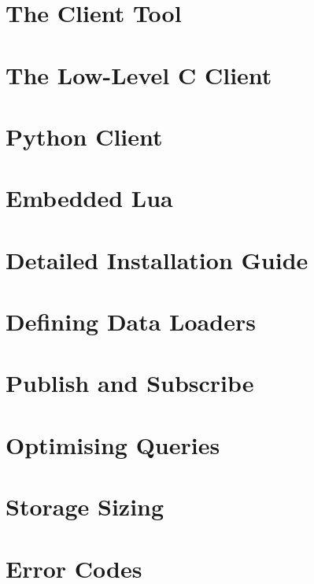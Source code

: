 \documentclass{scrreprt}
\begin{document}
\chapter{The Client Tool}\label{chpt_clienttool}

\chapter{The Low-Level C Client}\label{chpt_llc}


\chapter{Python Client}\label{chpt_pythonclient}




\chapter{Embedded Lua}\label{chpt_luaemb}

\chapter{Detailed Installation Guide}\label{chpt_install}

\chapter{Defining Data Loaders}\label{chpt_loader}

\chapter{Publish and Subscribe}\label{chpt_pubsub}

\chapter{Optimising Queries}\label{chpt_opt}


\chapter{Storage Sizing}\label{chpt_sizing}

\chapter{Error Codes}\label{chpt_errors}

\end{document}
